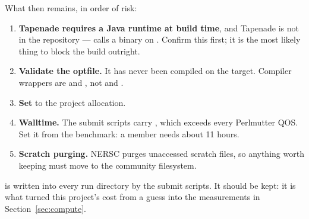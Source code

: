 What then remains, in order of risk:

\begin{enumerate}
  \item \textbf{Tapenade requires a Java runtime at build time}, and Tapenade is
        not in the repository ---  calls a 
        binary on . Confirm this first; it is the most likely thing
        to block the build outright.
  \item \textbf{Validate the optfile.} It has never been compiled on the target.
        Compiler wrappers are  and , not  and
        .
  \item \textbf{Set } to the project allocation.
  \item \textbf{Walltime.} The submit scripts carry , which
        exceeds every Perlmutter QOS. Set it from the benchmark: a member needs
        about 11 hours.
  \item \textbf{Scratch purging.} NERSC purges unaccessed scratch files, so
        anything worth keeping must move to the community filesystem.
\end{enumerate}

 is written into every run directory by the submit scripts.
It should be kept: it is what turned this project's cost from a guess into the
measurements in Section~\ref{sec:compute}.

